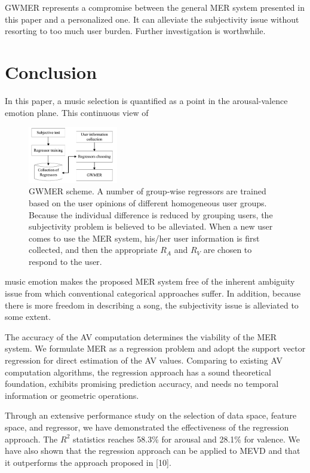 \documentclass[journal, twoside]{IEEEtran}
\begin{document}
GWMER represents a compromise between the general MER system presented in this paper and a personalized one. It can alleviate the subjectivity issue without resorting to too much user burden. Further investigation is worthwhile.








\section{Conclusion}
In this paper, a music selection is quantified as a point in the arousal-valence emotion plane. This continuous view of

\begin{figure}[h]
\centering
\captionsetup{justification=centering}
\includegraphics[width=0.35\textwidth, height=0.2\textwidth]{fig7.png}
\caption{GWMER scheme. A number of group-wise regressors are trained based
on the user opinions of different homogeneous user groups. Because the individual difference is reduced by grouping users, the subjectivity problem is believed to be alleviated. When a new user comes to use the MER system, his/her
user information is first collected, and then the appropriate $R_A$ and $R_V$ are
chosen to respond to the user.}
\label{fig3}
\end{figure}

music emotion makes the proposed MER system free of the inherent ambiguity issue from which conventional categorical approaches suffer. In addition, because there is more freedom in describing a song, the subjectivity issue is alleviated to some extent.

The accuracy of the AV computation determines the viability of the MER system. We formulate MER as a regression problem and adopt the support vector regression for direct estimation of the AV values. Comparing to existing AV computation algorithms, the regression approach has a sound theoretical foundation, exhibits promising prediction accuracy, and needs no temporal information or geometric operations.

Through an extensive performance study on the selection of data space, feature space, and regressor, we have demonstrated the effectiveness of the regression approach. The $R^2$ statistics reaches 58.3\% for arousal and 28.1\% for valence. We have also shown that the regression approach can be applied to MEVD and that it outperforms the approach proposed in [10].
\end{document}
